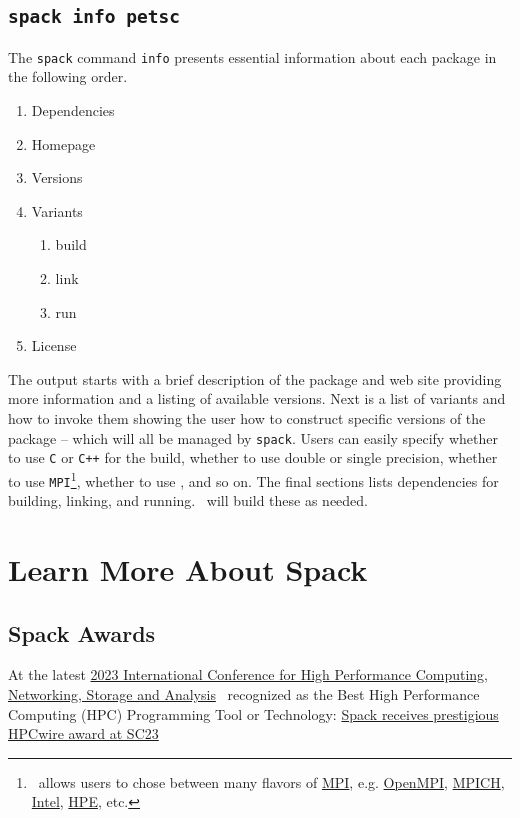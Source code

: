 \documentclass[10pt, oneside]{article}   	%
\begin{document}
\subsection{\texttt{spack info petsc}}
The \texttt{spack} command \texttt{info} presents essential information about each package in the following order. 
\begin{enumerate}
	\item Dependencies
	\item Homepage
	\item Versions
	\item Variants
	\begin{enumerate}
		\item build
		\item link
		\item run
	\end{enumerate}
	\item License
\end{enumerate}

The output starts with a brief description of the package and web site providing more information and a listing of available versions. Next is a list of variants and how to invoke them showing the user how to construct specific versions of the package -- which will all be managed by \texttt{spack}.  Users can easily specify whether to use \texttt{C} or \texttt{C++} for the build, whether to use double or single precision, whether to use \texttt{MPI}\footnote{\spack \ allows users to chose between many flavors of \href{https://www.mpi-forum.org/}{MPI}, e.g. \href{https://www.open-mpi.org/}{OpenMPI}, \href{https://www.mpich.org/}{MPICH}, \href{https://www.intel.com/content/www/us/en/developer/tools/oneapi/mpi-library.html}{Intel}, \href{https://downloads.linux.hpe.com/SDR/project/mpi/}{HPE}, etc.}, whether to use \openmp, and so on. The final sections lists dependencies for building, linking, and running. \spack \ will build these as needed.

	

\section{Learn More About Spack}

\subsection{Spack Awards}
At the latest \href{https://sc23.supercomputing.org/}{2023 International Conference for High Performance Computing, Networking, Storage and Analysis}  \spack \ recognized as the Best High Performance Computing (HPC) Programming Tool or Technology:
\href{https://www.llnl.gov/article/50626/spack-receives-prestigious-hpcwire-award-sc23}{Spack receives prestigious HPCwire award at SC23}
\end{document}
